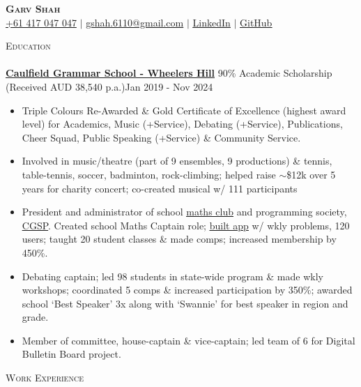 \documentclass[a4paper]{article}
\newcommand{\lineunder} {
    \vspace*{-8pt} \\
    \hspace*{-10pt} \hrulefill \\
}
\newcommand{\header} [1] {
    {\hspace*{-10pt}\vspace*{6pt} \textsc{#1}}
    \vspace*{-6pt} \lineunder
}
\begin{document}

\begin{center}
    \textbf{\Huge \scshape Garv Shah} \\ \vspace{1pt}
    \small \href{tel:+61417047047}{+61 417 047 047} $|$ \href{mailto:gshah.6110@gmail.com}{gshah.6110@gmail.com} $|$
    \href{https://www.linkedin.com/in/garvshah/}{\ul{LinkedIn}} $|$
    \href{https://garv-shah.github.io/}{\ul{GitHub}}
\end{center}
\vspace{-2mm}

\header{Education}
\href{https://www.caulfieldgs.vic.edu.au/wheelers-hill/}{\textbf{\ul{Caulfield Grammar School - Wheelers Hill}}} 90\% Academic Scholarship (Received AUD 38,540 p.a.)\hfill Jan 2019 - Nov 2024\\
\vspace{-2mm}
\begin{itemize} \itemsep -1pt
	\item Triple Colours Re-Awarded \& Gold Certificate of Excellence (highest award level) for Academics, Music (+Service), Debating (+Service), Publications, Cheer Squad, Public Speaking (+Service) \& Community Service.
        \item Involved in music/theatre (part of 9 ensembles, 9 productions) \& tennis, table-tennis, soccer, badminton, rock-climbing;
        helped raise $\sim$\$12k over 5 years for charity concert; co-created musical w/ 111 participants
        \item President and administrator of school \href{https://cgs-math.github.io/}{\ul{maths club}} and programming society, \href{https://cgs-programming.github.io}{\ul{CGSP}}.
        Created school Maths Captain role; \href{https://github.com/cgs-math/app}{\ul{built app}} w/ wkly problems, 120 users; taught 20 student classes \& made comps; increased membership by 450\%.
        \item Debating captain; led 98 students in state-wide program \& made wkly workshops; coordinated 5 comps \& increased participation by 350\%; awarded school ‘Best Speaker’ 3x along with ‘Swannie’ for best speaker in region and grade.
        \item Member of committee, house-captain \& vice-captain; led team of 6 for Digital Bulletin Board project.
\end{itemize}
\vspace{-2mm}

\header{Work Experience}
\end{document}
